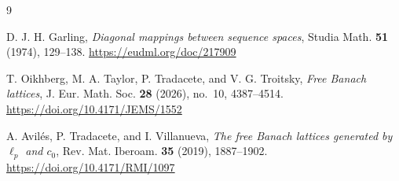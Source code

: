 \documentclass[11pt]{article}
\theoremstyle{remark}
\begin{document}
\begin{thebibliography}{9}

D. J. H. Garling,
\emph{Diagonal mappings between sequence spaces},
Studia Math. \textbf{51} (1974), 129--138.
\url{https://eudml.org/doc/217909}

T. Oikhberg, M. A. Taylor, P. Tradacete, and V. G. Troitsky,
\emph{Free Banach lattices},
J. Eur. Math. Soc. \textbf{28} (2026), no.~10, 4387--4514.
\url{https://doi.org/10.4171/JEMS/1552}

A. Avil\'es, P. Tradacete, and I. Villanueva,
\emph{The free Banach lattices generated by $\ell_p$ and $c_0$},
Rev. Mat. Iberoam. \textbf{35} (2019), 1887--1902.
\url{https://doi.org/10.4171/RMI/1097}

\end{thebibliography}
\end{document}
